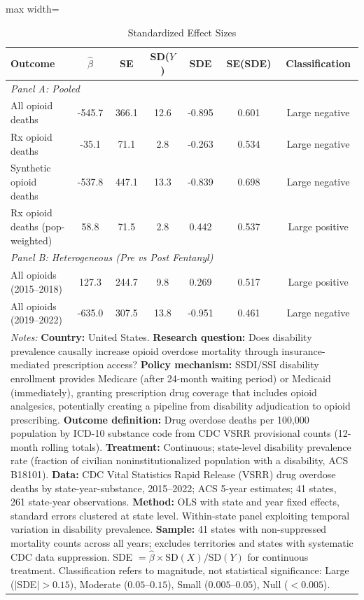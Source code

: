 \begin{table}[htbp]
\centering
\caption{Standardized Effect Sizes}
\label{tab:sde}
\begin{adjustbox}{max width=\textwidth}
\begin{tabular}{lcccccc}
\hline\hline
Outcome & $\hat{\beta}$ & SE & SD($Y$) & SDE & SE(SDE) & Classification \\
\hline
\multicolumn{7}{l}{\textit{Panel A: Pooled}} \\[3pt]
All opioid deaths & -545.7 & 366.1 & 12.6 & -0.895 & 0.601 & Large negative \\
Rx opioid deaths & -35.1 & 71.1 & 2.8 & -0.263 & 0.534 & Large negative \\
Synthetic opioid deaths & -537.8 & 447.1 & 13.3 & -0.839 & 0.698 & Large negative \\
Rx opioid deaths (pop-weighted) & 58.8 & 71.5 & 2.8 & 0.442 & 0.537 & Large positive \\
[6pt]
\multicolumn{7}{l}{\textit{Panel B: Heterogeneous (Pre vs Post Fentanyl)}} \\[3pt]
All opioids (2015--2018) & 127.3 & 244.7 & 9.8 & 0.269 & 0.517 & Large positive \\
All opioids (2019--2022) & -635.0 & 307.5 & 13.8 & -0.951 & 0.461 & Large negative \\
\hline\hline
\multicolumn{7}{p{14cm}}{\footnotesize \textit{Notes:} \textbf{Country:} United States. \textbf{Research question:} Does disability prevalence causally increase opioid overdose mortality through insurance-mediated prescription access? \textbf{Policy mechanism:} SSDI/SSI disability enrollment provides Medicare (after 24-month waiting period) or Medicaid (immediately), granting prescription drug coverage that includes opioid analgesics, potentially creating a pipeline from disability adjudication to opioid prescribing. \textbf{Outcome definition:} Drug overdose deaths per 100,000 population by ICD-10 substance code from CDC VSRR provisional counts (12-month rolling totals). \textbf{Treatment:} Continuous; state-level disability prevalence rate (fraction of civilian noninstitutionalized population with a disability, ACS B18101). \textbf{Data:} CDC Vital Statistics Rapid Release (VSRR) drug overdose deaths by state-year-substance, 2015--2022; ACS 5-year estimates; 41 states, 261 state-year observations. \textbf{Method:} OLS with state and year fixed effects, standard errors clustered at state level. Within-state panel exploiting temporal variation in disability prevalence. \textbf{Sample:} 41 states with non-suppressed mortality counts across all years; excludes territories and states with systematic CDC data suppression. SDE $= \hat{\beta} \times \text{SD}(X) / \text{SD}(Y)$ for continuous treatment. Classification refers to magnitude, not statistical significance: Large ($|$SDE$| > 0.15$), Moderate ($0.05$--$0.15$), Small ($0.005$--$0.05$), Null ($< 0.005$).} \\
\end{tabular}
\end{adjustbox}
\end{table}
